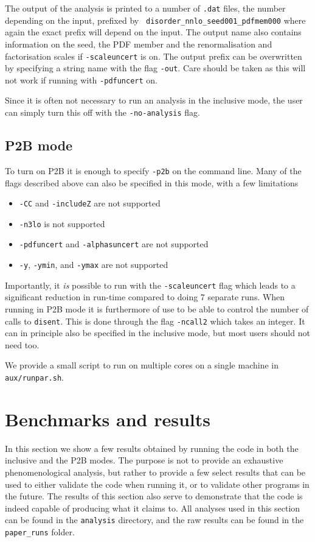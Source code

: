 \documentclass[submission, PhysCodeb]{SciPost}
\newcommand{\disent}{{\tt disent}}
\begin{document}
The output of the analysis is printed to a number of {\tt .dat} files,
the number depending on the input, prefixed by {\tt
  disorder\_nnlo\_seed001\_pdfmem000} where again the exact prefix
will depend on the input. The output name also contains information on
the seed, the PDF member and the renormalisation and factorisation
scales if {\tt -scaleuncert} is on. The output prefix can be
overwritten by specifying a string name with the flag {\tt -out}. Care
should be taken as this will not work if running with {\tt -pdfuncert}
on.

Since it is often not necessary to run an analysis in the inclusive
mode, the user can simply turn this off with the {\tt -no-analysis}
flag.

\subsection{P2B mode}
\label{sec:P2Bmode}
To turn on P2B it is enough to specify {\tt -p2b} on the command
line. Many of the flags described above can also be specified in this
mode, with a few limitations
\begin{itemize}
\item {\tt -CC} and {\tt -includeZ} are not supported
\item {\tt -n3lo} is not supported
\item {\tt -pdfuncert} and {\tt -alphasuncert} are not supported
\item {\tt -y}, {\tt -ymin}, and {\tt -ymax} are not supported
\end{itemize}
Importantly, it \emph{is} possible to run with the {\tt -scaleuncert}
flag which leads to a significant reduction in run-time compared to
doing 7 separate runs. When running in P2B mode it is furthermore of
use to be able to control the number of calls to \disent{}. This is
done through the flag {\tt -ncall2} which takes an integer. It can in
principle also be specified in the inclusive mode, but most users
should not need too.

We provide a small script to run on multiple cores on a single machine
in {\tt aux/runpar.sh}. 

\section{Benchmarks and results}
\label{sec:results}
In this section we show a few results obtained by running the code in
both the inclusive and the P2B modes. The purpose is not to provide an
exhaustive phenomenological analysis, but rather to provide a few
select results that can be used to either validate the code when
running it, or to validate other programs in the future. The results
of this section also serve to demonstrate that the code is indeed
capable of producing what it claims to. All analyses used in this
section can be found in the {\tt analysis} directory, and the raw
results can be found in the {\tt paper\_runs} folder.
\end{document}
